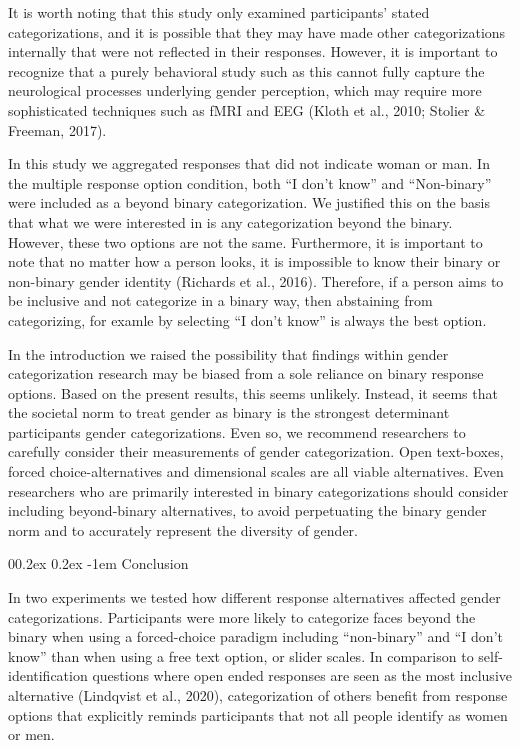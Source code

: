 \documentclass[
  man]{apa7}
\makeatletter
\let\oldparagraph\paragraph
\renewcommand{\paragraph}[1]{\oldparagraph{#1}\mbox{}}
\renewcommand{\paragraph}{\@startsection{paragraph}{4}{\parindent}%
  {0\baselineskip \@plus 0.2ex \@minus 0.2ex}%
  {-1em}%
  {\normalfont\normalsize\bfseries\itshape\typesectitle}}
\renewcommand{\paragraph}{\@startsection{paragraph}{4}{\parindent}%
  {0\baselineskip \@plus 0.2ex \@minus 0.2ex}%
  {-1em}%
  {\normalfont\normalsize\bfseries\typesectitle}}
\makeatother
\begin{document}
It is worth noting that this study only examined participants' stated categorizations, and it is possible that they may have made other categorizations internally that were not reflected in their responses. However, it is important to recognize that a purely behavioral study such as this cannot fully capture the neurological processes underlying gender perception, which may require more sophisticated techniques such as fMRI and EEG (Kloth et al., 2010; Stolier \& Freeman, 2017).

In this study we aggregated responses that did not indicate woman or man. In the multiple response option condition, both ``I don't know'' and ``Non-binary'' were included as a beyond binary categorization. We justified this on the basis that what we were interested in is any categorization beyond the binary. However, these two options are not the same. Furthermore, it is important to note that no matter how a person looks, it is impossible to know their binary or non-binary gender identity (Richards et al., 2016). Therefore, if a person aims to be inclusive and not categorize in a binary way, then abstaining from categorizing, for examle by selecting ``I don't know'' is always the best option.

In the introduction we raised the possibility that findings within gender categorization research may be biased from a sole reliance on binary response options. Based on the present results, this seems unlikely. Instead, it seems that the societal norm to treat gender as binary is the strongest determinant participants gender categorizations. Even so, we recommend researchers to carefully consider their measurements of gender categorization. Open text-boxes, forced choice-alternatives and dimensional scales are all viable alternatives. Even researchers who are primarily interested in binary categorizations should consider including beyond-binary alternatives, to avoid perpetuating the binary gender norm and to accurately represent the diversity of gender.

\hypertarget{conclusion}{%
\paragraph{Conclusion}\label{conclusion}}

In two experiments we tested how different response alternatives affected gender categorizations. Participants were more likely to categorize faces beyond the binary when using a forced-choice paradigm including ``non-binary'' and ``I don't know'' than when using a free text option, or slider scales. In comparison to self-identification questions where open ended responses are seen as the most inclusive alternative (Lindqvist et al., 2020), categorization of others benefit from response options that explicitly reminds participants that not all people identify as women or men.
\end{document}
